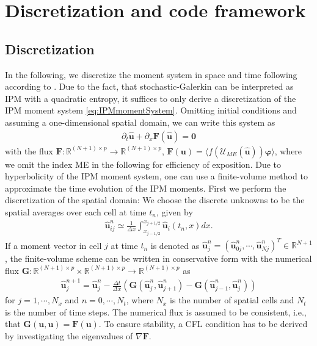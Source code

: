 \section{Discretization and code framework}
\label{sec:framework}
\subsection{Discretization}
In the following, we discretize the moment system in space and time following according to \cite{kusch2017maximum}. Due to the fact, that stochastic-Galerkin can be interpreted as IPM with a quadratic entropy, it suffices to only derive a discretization of the IPM moment system \eqref{eq:IPMmomentSystem}.  
Omitting initial conditions and assuming a one-dimensional spatial domain, we can write this system  as
\begin{align*}
\partial_t \bm{\hat u}+\partial_x \bm{F}(\bm{\hat u}) = \bm{0}
\end{align*}
with the flux $\bm{F}:\mathbb{R}^{(N+1)\times p}\to\mathbb{R}^{(N+1)\times p}$, $\bm{F}(\bm{u})=\langle f(\mathcal{U}_{ME}(\bm{\hat u}))\bm{\varphi} \rangle$, where we omit the index ME in the following for efficiency of exposition. Due to hyperbolicity of the IPM moment system, one can use a finite-volume method to approximate the time evolution of the IPM moments. First we perform the discretization of the spatial domain: We choose the discrete unknowns to be the spatial averages over each cell at time $t_n$, given by
\begin{align*}
\bm{\hat u}_{ij}^n \simeq \frac{1}{\Delta x}\int_{x_{j-1/ 2}}^{x_{j+1/ 2}}\bm{\hat u}_i(t_n,x) dx.
\end{align*}
If a moment vector in cell $j$ at time $t_n$ is denoted as $\bm{\hat u}_j^n = (\bm{\hat u}_{0j}^n,\cdots,\bm{\hat u}_{Nj}^n)^T\in\mathbb{R}^{N+1}$, the finite-volume scheme can be written in conservative form with the numerical flux $\bm{G}:\mathbb{R}^{(N+1)\times p}\times\mathbb{R}^{(N+1)\times p}\to\mathbb{R}^{(N+1)\times p}$ as
\begin{align}\label{eq:IPMDiscretization}
\bm{\hat u}_{j}^{n+1} = \bm{\hat u}_{j}^{n}  - \frac{\Delta t}{\Delta x}\left( \bm{G}(\bm{\hat u}_{j}^{n},\bm{\hat u}_{j+1}^{n})- \bm{G}(\bm{\hat u}_{j-1}^{n},\bm{\hat u}_{j}^{n})\right)
\end{align}
for $j = 1,\cdots,N_x$ and $n = 0,\cdots,N_t$, where $N_x$ is the number of spatial cells and $N_t$ is the number of time steps.
The numerical flux is assumed to be consistent, i.e., that $\bm{G}(\bm{u},\bm{u})=\bm{F}(\bm{u})$.
To ensure stability, a CFL condition has to be derived by investigating the eigenvalues of $\nabla \bm{F}$.

